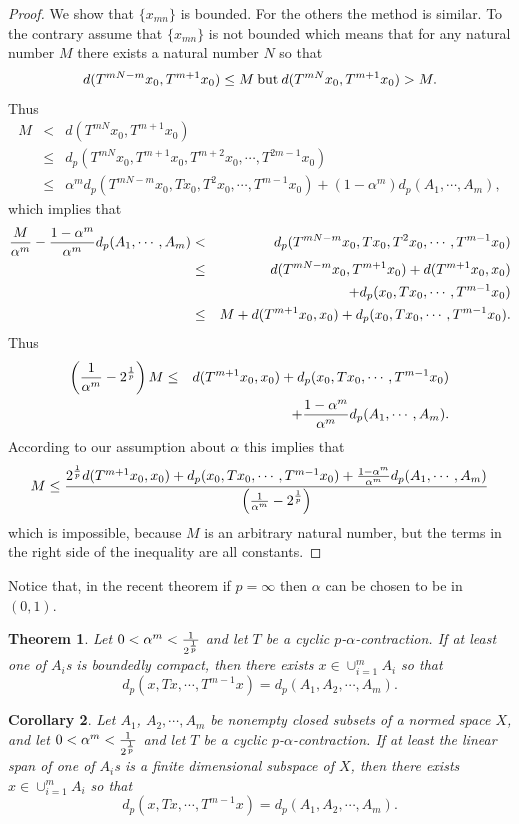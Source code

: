 \documentclass{amsart}
\newtheorem{theorem}{Theorem}[section]
\newtheorem{corollary}[theorem]{Corollary}
\theoremstyle{definition}
\theoremstyle{remark}
\begin{document}
\begin{proof}
We show that $\{x_{mn}\}$ is bounded. For the others the method is similar. To the contrary assume that $\{x_{mn}\}$ is not bounded which means that for any natural number $M$ there exists a natural number $N$ so that
$$d(T^{mN-m}x_0,T^{m+1}x_0)\leq M\:{\rm but}\:d(T^{mN}x_0,T^{m+1}x_0)>M.$$
Thus
\begin{eqnarray*}
M&<&d(T^{mN}x_0,T^{m+1}x_0)\\&\leq& d_p(T^{mN}x_0,T^{m+1}x_0,T^{m+2}x_0,\cdots,T^{2m-1}x_0)\\&\leq&\alpha^md_p(T^{mN-m}x_0,Tx_0,T^2x_0,\cdots,T^{m-1}x_0)+(1-\alpha^m)d_p(A_1,\cdots,A_m),
\end{eqnarray*}
which implies that
\begin{eqnarray*}
{M\over{\alpha^m}}-{{1-\alpha^m}\over{\alpha^m}}d_p(A_1,\cdots,A_m)&<&d_p(T^{mN-m}x_0,Tx_0,T^2x_0,\cdots,T^{m-1}x_0)\\
&\leq&d(T^{mN-m}x_0,T^{m+1}x_0)+d(T^{m+1}x_0,x_0)\\&&+d_p(x_0,Tx_0,\cdots,T^{m-1}x_0)\\&\leq&M+d(T^{m+1}x_0,x_0)+d_p(x_0,Tx_0,\cdots,T^{m-1}x_0).
\end{eqnarray*}
Thus
\begin{eqnarray*}
\left({{1}\over{\alpha^m}}-2^{1\over p}\right)M&\leq&d(T^{m+1}x_0,x_0)+d_p(x_0,Tx_0,\cdots,T^{m-1}x_0)\\&&+{{1-\alpha^m}\over{\alpha^m}}d_p(A_1,\cdots,A_m).
\end{eqnarray*}
According to our assumption about $\alpha$ this implies that
\begin{eqnarray*}
M\leq {{2^{1\over p}d(T^{m+1}x_0,x_0)+d_p(x_0,Tx_0,\cdots,T^{m-1}x_0)+{{1-\alpha^m}\over{\alpha^m}}d_p(A_1,\cdots,A_m)}\over{\left({{1}\over{\alpha^m}}-2^{1\over p}\right)}}
\end{eqnarray*}
which is impossible, because $M$ is an arbitrary natural number, but the terms in the right side of the inequality are all constants.
\end{proof}
Notice that, in the recent theorem if $p=\infty$ then $\alpha$ can be chosen to be in $(0,1)$.
\begin{theorem}Let $0<\alpha^m<{1\over{2^{1\over p}}}$ and let $T$ be a cyclic $p$-$\alpha$-contraction. If at least one of $A_i$s is boundedly compact, then there exists $x\in\cup_{i=1}^mA_i$ so that
$$d_p(x,Tx,\cdots,T^{m-1}x)=d_p(A_1,A_2,\cdots,A_m).$$
\end{theorem}
\begin{corollary}\label{C1}
Let $A_1$, $A_2,\cdots, A_m$ be nonempty closed subsets of a normed space $X$, and let $0<\alpha^m<{1\over{2^{1\over p}}}$ and let $T$ be a cyclic $p$-$\alpha$-contraction. If at least the linear span of one of $A_i$s is a finite dimensional subspace of $X$, then there exists $x\in\cup_{i=1}^mA_i$ so that
$$d_p(x,Tx,\cdots,T^{m-1}x)=d_p(A_1,A_2,\cdots,A_m).$$
\end{corollary}
\end{document}
